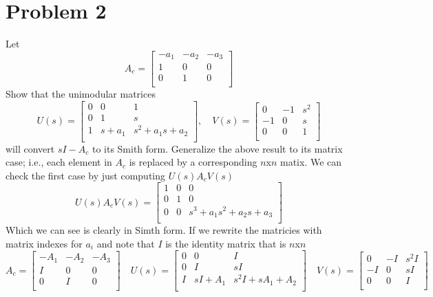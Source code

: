 \documentclass{article}
\begin{document}
\newpage
\section*{Problem 2}
Let
\[
A_c =
\begin{bmatrix}
-a_1 & -a_2 & -a_3 \\
   1 &    0 &    0 \\
   0 &    1 &    0 \\
\end{bmatrix}
\]
Show that the unimodular matrices
\[
U(s) =
\begin{bmatrix}
0 & 0 & 1 \\
0 & 1 & s \\
1 & s+a_1 & s^2+a_1s+a_2 \\
\end{bmatrix}
, \quad
V(s) =
\begin{bmatrix}
0 & -1 & s^2 \\
-1 & 0 & s \\
0 & 0 & 1 \\
\end{bmatrix}
\]
will convert \(sI-A_c\) to its Smith form.
Generalize the above result to its matrix case;
i.e., each element in \(A_c\) is replaced by a corresponding \(n\)x\(n\) matix.
\newline
\newline
We can check the first case by just computing $U(s)A_cV(s)$
$$
U(s)A_cV(s) =
\begin{bmatrix}
1 & 0 & 0 \\
0 & 1 & 0 \\
0 & 0 & s^3 + a_1 s^2 + a_2 s + a_3 \\
\end{bmatrix}
$$
Which we can see is clearly in Simth form.
If we rewrite the matricies with matrix indexes for $a_i$ and note that $I$ is the identity matrix that is $n$x$n$
$$
A_c =
\begin{bmatrix}
-A_1 & -A_2 & -A_3 \\
   I &    0 &    0 \\
   0 &    I &    0 \\
\end{bmatrix}
\quad
U(s) =
\begin{bmatrix}
0 & 0 & I \\
0 & I & sI \\
I & sI+A_1 & s^2I+sA_1 + A_2 \\
\end{bmatrix}
\quad
V(s) =
\begin{bmatrix}
0 & -I & s^2I \\
-I & 0 & sI \\
0 & 0 & I \\
\end{bmatrix}
$$
\end{document}
